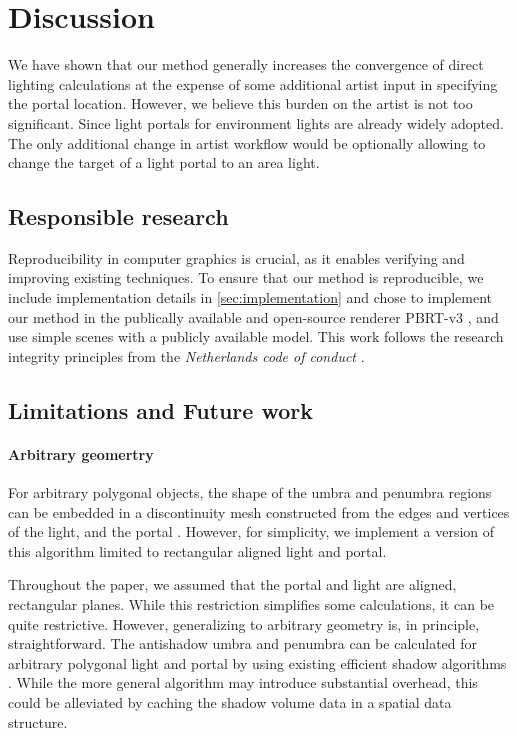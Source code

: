 \section{Discussion}
\label{sec:discussion}

We have shown that our method generally increases the convergence of direct lighting calculations at the expense of some additional artist input in specifying the portal location. However, we believe this burden on the artist is not too significant. Since light portals for environment lights are already widely adopted. The only additional change in artist workflow would be optionally allowing to change the target of a light portal to an area light.

\subsection{Responsible research}
Reproducibility in computer graphics is crucial, as it enables verifying and improving  existing techniques. To ensure that our method is reproducible, we include implementation details in \autoref{sec:implementation} and chose to implement our method in the publically available and open-source renderer PBRT-v3 \cite*[]{pharrPhysicallyBasedRendering2016}, and use simple scenes with a publicly available model. This work follows the research integrity principles from the \emph{Netherlands code of conduct} .

\subsection{Limitations and Future work}

\paragraph*{Arbitrary geomertry}

For arbitrary polygonal objects, the shape of the umbra and penumbra regions can be embedded in a discontinuity mesh constructed from the edges and vertices of the light, and the portal \cite*{drettakisFastShadowAlgorithm1994}. However, for simplicity, we implement a version of this algorithm limited to rectangular aligned light and portal.

Throughout the paper, we assumed that the portal and light are aligned, rectangular planes. While this restriction simplifies some calculations, it can be quite restrictive. However, generalizing to arbitrary geometry is, in principle, straightforward. The antishadow umbra and penumbra can be calculated for arbitrary polygonal light and portal by using existing efficient shadow algorithms \cite*[]{drettakisFastShadowAlgorithm1994}. While the more general algorithm may introduce substantial overhead, this could be alleviated by caching the shadow volume data in a spatial data structure. 


